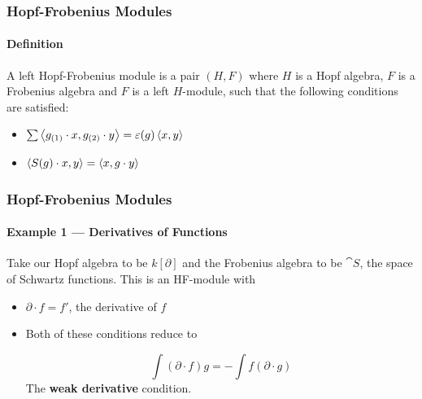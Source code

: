 \documentclass{beamer}
\begin{document}


\begin{frame}

\frametitle{Hopf-Frobenius Modules}
\framesubtitle{Definition}

A left Hopf-Frobenius module is a pair $(H,F)$ where $H$ is a Hopf algebra, $F$ is a Frobenius algebra and $F$ is a left $H$-module, such that the following conditions are satisfied:

\bigskip

\begin{itemize}


\item {}  $\sum \left\langle g_{(1)} \cdot x, g_{(2)} \cdot y \right\rangle = \varepsilon(g) \left\langle x,y \right\rangle$

\medskip

\item {}  $\left\langle S(g) \cdot x, y \right\rangle = \left\langle x, g \cdot y \right\rangle$

\end{itemize}





\end{frame}


\begin{frame}

\frametitle{Hopf-Frobenius Modules}
\framesubtitle{Example 1 --- Derivatives of Functions}


Take our Hopf algebra to be $k[\partial]$ and the Frobenius algebra to be $\cat{S}$, the space of Schwartz functions. This is an HF-module with

\bigskip

\begin{itemize}

\item {} $\partial \cdot f = f'$, the derivative of $f$


\medskip

\item {} Both of these conditions reduce to

\begin{equation*}
\int (\partial \cdot f) g  = - \int f (\partial \cdot g)
\end{equation*}
The \textbf{weak derivative} condition.
%
\end{itemize}


\end{frame}
\end{document}
